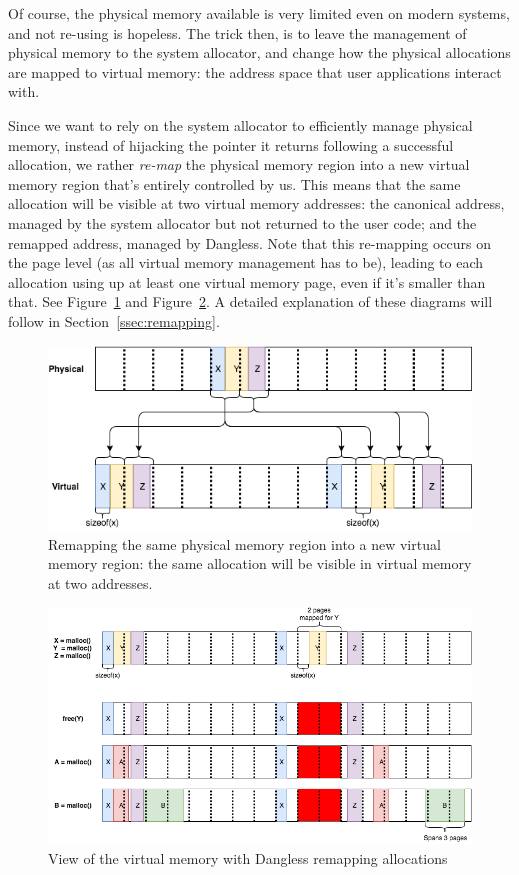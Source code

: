 Of course, the physical memory available is very limited even on modern systems, and not re-using is hopeless. The trick then, is to leave the management of physical memory to the system allocator, and change how the physical allocations are mapped to virtual memory: the address space that user applications interact with.

Since we want to rely on the system allocator to efficiently manage physical memory, instead of hijacking the pointer it returns following a successful allocation, we rather \emph{re-map} the physical memory region into a new virtual memory region that's entirely controlled by us. This means that the same allocation will be visible at two virtual memory addresses: the canonical address, managed by the system allocator but not returned to the user code; and the remapped address, managed by Dangless. Note that this re-mapping occurs on the page level (as all virtual memory management has to be), leading to each allocation using up at least one virtual memory page, even if it's smaller than that. See Figure~\ref{fig:dangless_virtremap_mappings} and Figure~\ref{fig:dangless_virtremap_view}. A detailed explanation of these diagrams will follow in Section~\ref{ssec:remapping}.

\begin{figure}
	\centering
	\includegraphics[width=\textwidth]{img/dangless_virtremap_mappings_xyz.png}
	\caption{Remapping the same physical memory region into a new virtual memory region: the same allocation will be visible in virtual memory at two addresses.}
	\label{fig:dangless_virtremap_mappings}
\end{figure}

\begin{figure}
	\centering
	\includegraphics[width=\textwidth]{img/dangless_virtremap.png}
	\caption{View of the virtual memory with Dangless remapping allocations}
	\label{fig:dangless_virtremap_view}
\end{figure}

